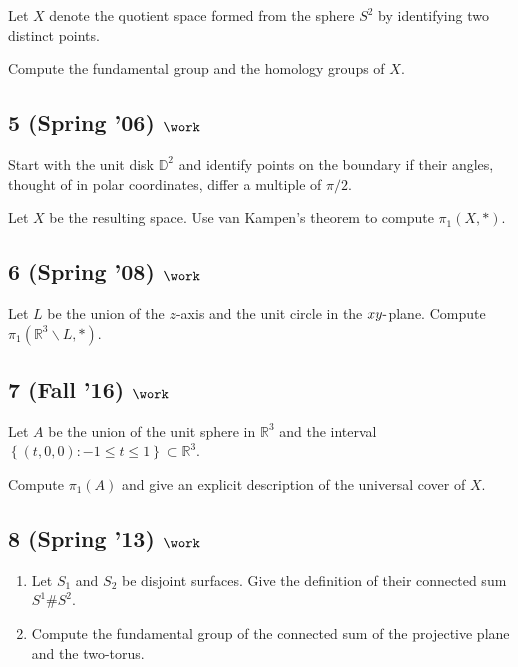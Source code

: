 Let \(X\) denote the quotient space formed from the sphere \(S^2\) by
identifying two distinct points.

Compute the fundamental group and the homology groups of \(X\).

\hypertarget{spring-06-work-2}{%
\subsection{\texorpdfstring{5 (Spring '06)
\(\work\)}{5 (Spring '06) \textbackslash work}}\label{spring-06-work-2}}

Start with the unit disk \({\mathbb{D}}^2\) and identify points on the
boundary if their angles, thought of in polar coordinates, differ a
multiple of \(\pi/2\).

Let \(X\) be the resulting space. Use van Kampen's theorem to compute
\(\pi_1 (X, \ast)\).

\hypertarget{spring-08-work}{%
\subsection{\texorpdfstring{6 (Spring '08)
\(\work\)}{6 (Spring '08) \textbackslash work}}\label{spring-08-work}}

Let \(L\) be the union of the \(z\)-axis and the unit circle in the
\(xy{\hbox{-}}\)plane. Compute
\(\pi_1 ({\mathbb{R}}^3 \backslash L, \ast)\).

\hypertarget{fall-16-work-2}{%
\subsection{\texorpdfstring{7 (Fall '16)
\(\work\)}{7 (Fall '16) \textbackslash work}}\label{fall-16-work-2}}

Let \(A\) be the union of the unit sphere in \({\mathbb{R}}^3\) and the
interval
\(\left\{{(t, 0, 0) : -1 \leq t \leq 1}\right\} \subset {\mathbb{R}}^3\).

Compute \(\pi_1 (A)\) and give an explicit description of the universal
cover of \(X\).

\hypertarget{spring-13-work-1}{%
\subsection{\texorpdfstring{8 (Spring '13)
\(\work\)}{8 (Spring '13) \textbackslash work}}\label{spring-13-work-1}}

\begin{enumerate}
\def\labelenumi{\alph{enumi}.}
\item
  Let \(S_1\) and \(S_2\) be disjoint surfaces. Give the definition of
  their connected sum \(S^1 \#S^2\).
\item
  Compute the fundamental group of the connected sum of the projective
  plane and the two-torus.
\end{enumerate}

